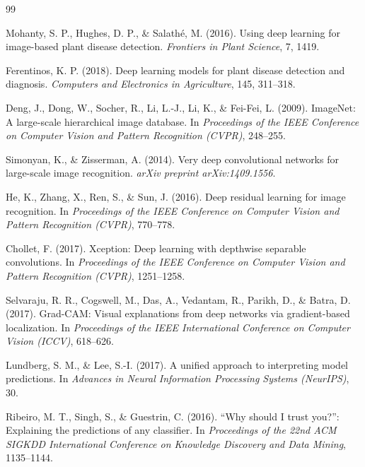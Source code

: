 \documentclass[12pt,a4paper,oneside]{report}
\begin{document}
\begin{thebibliography}{99}

Mohanty, S. P., Hughes, D. P., \& Salath\'{e}, M. (2016). Using deep learning for image-based plant disease
detection. \textit{Frontiers in Plant Science}, 7, 1419.

Ferentinos, K. P. (2018). Deep learning models for plant disease detection and diagnosis. \textit{Computers and
Electronics in Agriculture}, 145, 311--318.

Deng, J., Dong, W., Socher, R., Li, L.-J., Li, K., \& Fei-Fei, L. (2009). ImageNet: A large-scale hierarchical
image database. In \textit{Proceedings of the IEEE Conference on Computer Vision and Pattern Recognition (CVPR)},
248--255.

Simonyan, K., \& Zisserman, A. (2014). Very deep convolutional networks for large-scale image recognition.
\textit{arXiv preprint arXiv:1409.1556}.

He, K., Zhang, X., Ren, S., \& Sun, J. (2016). Deep residual learning for image recognition. In
\textit{Proceedings of the IEEE Conference on Computer Vision and Pattern Recognition (CVPR)}, 770--778.

Chollet, F. (2017). Xception: Deep learning with depthwise separable convolutions. In \textit{Proceedings of the
IEEE Conference on Computer Vision and Pattern Recognition (CVPR)}, 1251--1258.

Selvaraju, R. R., Cogswell, M., Das, A., Vedantam, R., Parikh, D., \& Batra, D. (2017). Grad-CAM: Visual
explanations from deep networks via gradient-based localization. In \textit{Proceedings of the IEEE International
Conference on Computer Vision (ICCV)}, 618--626.

Lundberg, S. M., \& Lee, S.-I. (2017). A unified approach to interpreting model predictions. In \textit{Advances
in Neural Information Processing Systems (NeurIPS)}, 30.

Ribeiro, M. T., Singh, S., \& Guestrin, C. (2016). ``Why should I trust you?'': Explaining the predictions of any
classifier. In \textit{Proceedings of the 22nd ACM SIGKDD International Conference on Knowledge Discovery and
Data Mining}, 1135--1144.


\end{thebibliography}
\end{document}
